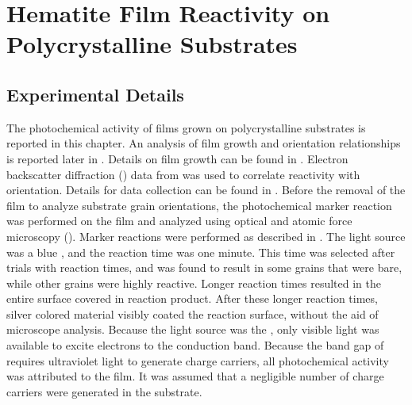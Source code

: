 
\chapter{Hematite Film Reactivity on Polycrystalline Substrates}
\label{ch:polycrystalline.reactivity}




\section{Experimental Details}
\label{sec:poly.reac.experimental}


The photochemical activity of  films grown on polycrystalline  substrates is reported in this chapter. An analysis of film growth and orientation relationships is reported later in . Details on film growth can be found in . Electron backscatter diffraction () data from  was used to correlate reactivity with orientation. Details for data collection can be found in . Before the removal of the film to analyze substrate grain orientations, the photochemical marker reaction was performed on the film and analyzed using optical and atomic force microscopy (). Marker reactions were performed as described in . The light source was a blue , and the reaction time was one minute. This time was selected after trials with reaction times, and was found to result in some grains that were bare, while other grains were highly reactive. Longer reaction times resulted in the entire surface covered in reaction product. After these longer reaction times, silver colored material visibly coated the reaction surface, without the aid of microscope analysis. Because the light source was the , only visible light was available to excite electrons to the conduction band. Because the band gap of  requires ultraviolet light to generate charge carriers, all photochemical activity was attributed to the film. It was assumed that a negligible number of charge carriers were generated in the substrate.

